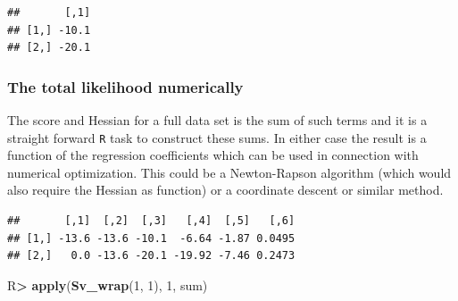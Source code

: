\documentclass[10pt,]{article}
\newenvironment{Shaded}{\begin{snugshade}}{\end{snugshade}}
\newcommand{\ControlFlowTok}[1]{\textcolor[rgb]{0.13,0.29,0.53}{\textbf{#1}}}
\newcommand{\DataTypeTok}[1]{\textcolor[rgb]{0.13,0.29,0.53}{#1}}
\newcommand{\DecValTok}[1]{\textcolor[rgb]{0.00,0.00,0.81}{#1}}
\newcommand{\KeywordTok}[1]{\textcolor[rgb]{0.13,0.29,0.53}{\textbf{#1}}}
\newcommand{\NormalTok}[1]{#1}
\newcommand{\OperatorTok}[1]{\textcolor[rgb]{0.81,0.36,0.00}{\textbf{#1}}}
\newcommand{\StringTok}[1]{\textcolor[rgb]{0.31,0.60,0.02}{#1}}
\begin{document}
\begin{verbatim}
##       [,1]
## [1,] -10.1
## [2,] -20.1
\end{verbatim}

\hypertarget{the-total-likelihood-numerically}{%
\subsubsection{The total likelihood
numerically}\label{the-total-likelihood-numerically}}

The score and Hessian for a full data set is the sum of such terms and
it is a straight forward \texttt{R} task to construct these sums. In
either case the result is a function of the regression coefficients
which can be used in connection with numerical optimization. This could
be a Newton-Rapson algorithm (which would also require the Hessian as
function) or a coordinate descent or similar method.

\begin{Shaded}
\end{Shaded}

\begin{verbatim}
##       [,1]  [,2]  [,3]   [,4]  [,5]   [,6]
## [1,] -13.6 -13.6 -10.1  -6.64 -1.87 0.0495
## [2,]   0.0 -13.6 -20.1 -19.92 -7.46 0.2473
\end{verbatim}

\begin{Shaded}
\begin{Highlighting}[]
\NormalTok{R}\OperatorTok{>}\StringTok{ }\KeywordTok{apply}\NormalTok{(}\KeywordTok{Sv_wrap}\NormalTok{(}\DecValTok{1}\NormalTok{, }\DecValTok{1}\NormalTok{), }\DecValTok{1}\NormalTok{, sum)}
\end{Highlighting}
\end{Shaded}
\end{document}
